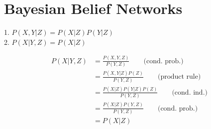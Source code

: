 \documentclass[12pt, letterpaper]{report}
\begin{document}
\section{Bayesian Belief Networks}

1. $P(X,Y|Z) = P(X|Z)P(Y|Z)$\\
2. $P(X|Y,Z) = P(X|Z)$

\begin{equation*}
\begin{split}
P(X|Y,Z) &= \frac{P(X,Y,Z)}{P(Y,Z)} \qquad \text{(cond. prob.)}\\
&= \frac{P(X,Y|Z)P(Z)}{P(Y,Z)} \qquad \text{(product rule)}\\
&= \frac{P(X|Z)P(Y|Z)P(Z)}{P(Y,Z)} \qquad \text{(cond. ind.)}\\
&= \frac{P(X|Z)P(Y,Z)}{P(Y,Z)} \qquad \text{(cond. prob.)} \label{eq1}\\
&= P(X|Z)
\end{split}
\end{equation*}
\end{document}
